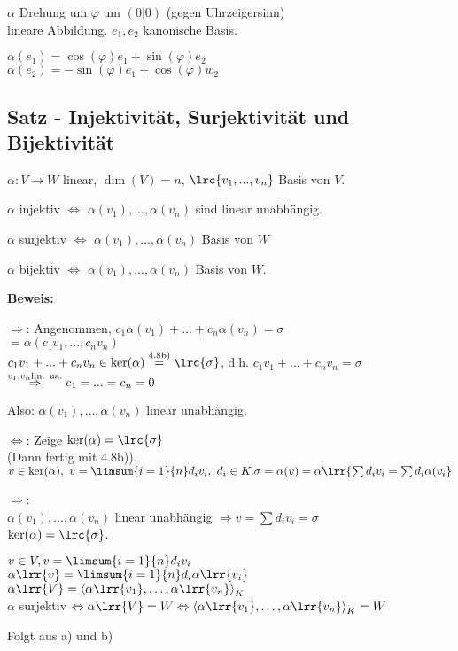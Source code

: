   $\alpha$ Drehung um $\varphi$ um $(0|0)$ (gegen Uhrzeigersinn)\\
  lineare Abbildung. $e_1,e_2$ kanonische Basis.

  $\alpha(e_1)=\cos(\varphi)e_1+\sin(\varphi)e_2$\\
  $\alpha(e_2)=-\sin(\varphi)e_1+\cos(\varphi)w_2$

  \subsection{Satz - Injektivität, Surjektivität und Bijektivität}

  $\alpha:V\rightarrow W$ linear, $\dim(V)=n$, $\lrc{v_1,...,v_n}$ Basis von $V$.

    \item $\alpha$ injektiv $\Leftrightarrow$ $\alpha(v_1),...,\alpha(v_n)$
      sind linear unabhängig.
    \item $\alpha$ surjektiv $\Leftrightarrow$ $\alpha(v_1),...,\alpha(v_n)$
      Basis von $W$
    \item $\alpha$ bijektiv $\Leftrightarrow$ $\alpha(v_1),...,\alpha(v_n)$
      Basis von $W$.
  \subExEnd

  \textbf{Beweis:}
    \item
      $\Rightarrow$: Angenommen, $c_1\alpha(v_1)+...+c_n\alpha(v_n)=\sigma$\\
      $=\alpha(c_1v_1,...,c_nv_n)$\\
      $c_1v_1+...+c_nv_n\in\mbox{ker}(\alpha)\overset{\mbox{\scriptsize 4.8b)}}{=}\lrc{\sigma}$, d.h. $c_1v_1+...+c_nv_n=\sigma$\\
      $\overset{v_1,v_n\mbox{\scriptsize lin. ua.}}{\Rightarrow} c_1=...=c_n=0$

      Also: $\alpha(v_1),\dots,\alpha(v_n)$ linear unabhängig.

      $\Leftrightarrow$: Zeige $\mbox{ker}(\alpha)=\lrc{\sigma}$\\
      (Dann fertig mit 4.8b)).\\
      $v\in\mbox{ker}(\alpha),\ v=\limsum{i=1}{n}d_iv_i,\ d_i\in K.\\
      \sigma=\alpha(v)=\alpha\lrr{\sum d_iv_i=\sum d_i\alpha(v_i}$

      $\Rightarrow$:\\
      $\alpha(v_1),...,\alpha(v_n)$ linear unabhängig $\Rightarrow v=\sum
      d_iv_i=\sigma$\\
      $\mbox{ker}(\alpha)=\lrc{\sigma}$.
     \item $v\in V, v=\limsum{i=1}{n}d_iv_i$\\
		$\alpha\lrr{v}=\limsum{i=1}{n}d_i\alpha\lrr{v_i}$\\
		$\alpha\lrr{V}=\left\langle\alpha\lrr{v_1},\dots,\alpha\lrr{v_n}\right\rangle_K$\\
		$\alpha$ surjektiv $\Leftrightarrow \alpha\lrr{V}=W \Leftrightarrow\left\langle\alpha\lrr{v_1},\dots,\alpha\lrr{v_n}\right\rangle_K=W$
	 \item Folgt aus a) und b)
	\subExEnd


